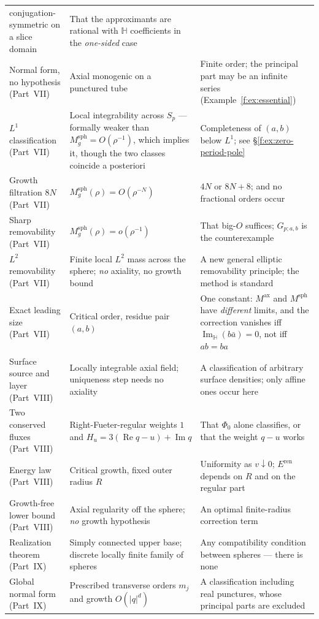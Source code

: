 \documentclass[11pt,a4paper]{article}
\numberwithin{equation}{section}
\theoremstyle{definition}
\theoremstyle{remark}
\theoremstyle{plain}
\newcommand{\HH}{\mathbb H}
\DeclareMathOperator{\Rea}{Re}
\DeclareMathOperator{\Ima}{Im}
\newcommand{\ImH}{\Ima_{\HH}}
\newcommand{\Sp}{S_{p}}
\newcommand{\Msph}{M^{\mathrm{sph}}}                  %
\newcommand{\Max}{M^{\mathrm{ax}}}                    %
\newcommand{\Eren}{E^{\mathrm{ren}}}
\newcommand{\abs}[1]{\lvert #1\rvert}
\begin{document}
{\begin{longtable}{@{}p{}p{}p{}@{}}
conjugation-symmetric on a slice domain &
That the approximants are rational with $\HH$ coefficients in the
\emph{one-sided} case\\
Normal form, no hypothesis (Part~VII) &
Axial monogenic on a punctured tube &
Finite order; the principal part may be an infinite series
(Example~\ref{f:ex:essential})\\
$L^1$ classification (Part~VII) &
Local integrability across $\Sp$ --- formally weaker than
$\Msph_g=O(\rho^{-1})$, which implies it, though the two classes coincide
a posteriori &
Completeness of $(a,b)$ below $L^1$; see
\S\ref{f:ex:zero-period-pole}\\
Growth filtration $8N$ (Part~VII) &
$\Msph_g(\rho)=O(\rho^{-N})$ &
$4N$ or $8N+8$; and no fractional orders occur\\
Sharp removability (Part~VII) &
$\Msph_g(\rho)=o(\rho^{-1})$ &
That big-$O$ suffices; $G_{p;a,b}$ is the counterexample\\
$L^2$ removability (Part~VII) &
Finite local $L^2$ mass across the sphere; \emph{no} axiality, no growth
bound &
A new general elliptic removability principle; the method is standard\\
Exact leading size (Part~VII) &
Critical order, residue pair $(a,b)$ &
One constant: $\Max$ and $\Msph$ have \emph{different} limits, and the
correction vanishes iff $\ImH(b\bar a)=0$, not iff $ab=ba$\\
Surface source and layer (Part~VIII) &
Locally integrable axial field; uniqueness step needs no axiality &
A classification of arbitrary surface densities; only affine ones occur
here\\
Two conserved fluxes (Part~VIII) &
Right-Fueter-regular weights $1$ and
$H_u=3(\Rea q-u)+\Ima q$ &
That $\Phi_0$ alone classifies, or that the weight $q-u$ works\\
Energy law (Part~VIII) &
Critical growth, fixed outer radius $R$ &
Uniformity as $v\downarrow0$; $\Eren$ depends on $R$ and on the regular part\\
Growth-free lower bound (Part~VIII) &
Axial regularity off the sphere; \emph{no} growth hypothesis &
An optimal finite-radius correction term\\
Realization theorem (Part~IX) &
Simply connected upper base; discrete locally finite family of spheres &
Any compatibility condition between spheres --- there is none\\
Global normal form (Part~IX) &
Prescribed transverse orders $m_j$ and growth $O(\abs q^{d})$ &
A classification including real punctures, whose principal parts are
excluded\\
\bottomrule
\end{longtable}}
\end{document}
